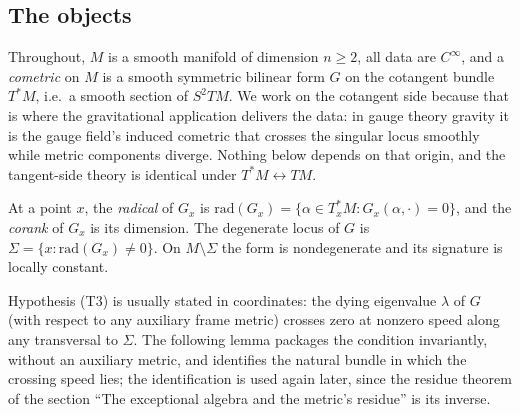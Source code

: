 \documentclass[11pt]{article}
\theoremstyle{definition}
\theoremstyle{plain}
\providecommand{\Sig}{}\renewcommand{\Sig}{\Sigma}
\providecommand{\rad}{}\renewcommand{\rad}{\mathrm{rad}}
\begin{document}
\subsection*{The objects}
\label{c:note.sheaf.setting-objects}
Throughout, $M$ is a smooth manifold of dimension $n \geq 2$, all data are $C^\infty$, and a \emph{cometric} on $M$ is a smooth symmetric bilinear form $G$ on the cotangent bundle $T^*M$, i.e.\ a smooth section of $S^2 TM$. We work on the cotangent side because that is where the gravitational application delivers the data: in gauge theory gravity it is the gauge field's induced cometric that crosses the singular locus smoothly while metric components diverge. Nothing below depends on that origin, and the tangent-side theory is identical under $T^*M \leftrightarrow TM$.

At a point $x$, the \emph{radical} of $G_x$ is $\rad(G_x) = \{\alpha \in T^*_xM : G_x(\alpha, \cdot) = 0\}$, and the \emph{corank} of $G_x$ is its dimension. The degenerate locus of $G$ is $\Sig = \{x : \rad(G_x) \neq 0\}$. On $M \setminus \Sig$ the form is nondegenerate and its signature is locally constant.

\label{c:note.sheaf.setting-objects-2}
Hypothesis (T3) is usually stated in coordinates: the dying eigenvalue $\lambda$ of $G$ (with respect to any auxiliary frame metric) crosses zero at nonzero speed along any transversal to $\Sig$. The following lemma packages the condition invariantly, without an auxiliary metric, and identifies the natural bundle in which the crossing speed lies; the identification is used again later, since the residue theorem of the section ``The exceptional algebra and the metric's residue'' is its inverse.
\end{document}
